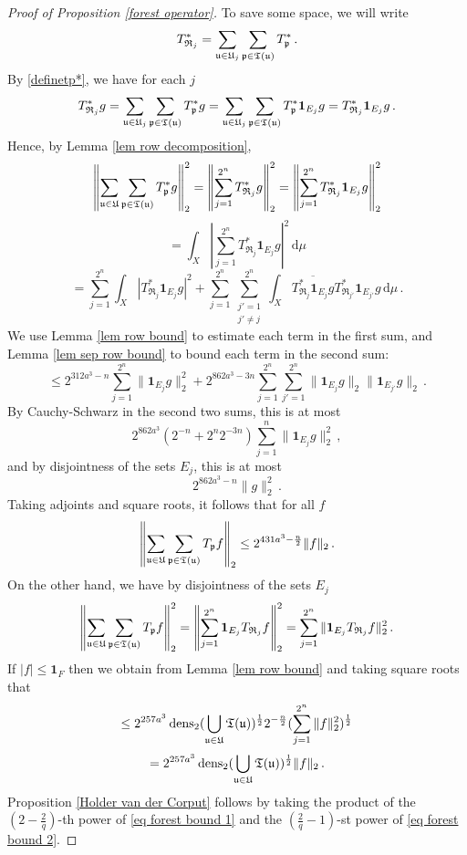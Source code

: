 {\begin{proof}[Proof of Proposition \ref{forest operator}]
    To save some space, we will write
    $$
        T_{\mathfrak{R}_j}^* = \sum_{\mathfrak u \in \mathfrak U_j} \sum_{\mathfrak p \in \mathfrak T(\mathfrak u)} T_{\mathfrak p}^*\,.
    $$
    By \eqref{definetp*}, we have for each $j$
    $$
        T_{\mathfrak{R}_j}^*g = \sum_{\mathfrak u \in \mathfrak U_j} \sum_{\mathfrak p \in \mathfrak T(\mathfrak u)} T_{\mathfrak p}^* g = \sum_{\mathfrak u \in \mathfrak U_j} \sum_{\mathfrak p \in \mathfrak T(\mathfrak u)} T_{\mathfrak p}^* \mathbf{1}_{E_j} g = T_{\mathfrak{R}_j}^* \mathbf{1}_{E_j} g\,.
    $$
    Hence, by Lemma \ref{lem row decomposition},
    $$
        \left\|\sum_{\mathfrak u \in \mathfrak U} \sum_{\mathfrak p \in \mathfrak T(\mathfrak u)} T^*_{\mathfrak p} g\right\|_2^2 = \left\|\sum_{j = 1}^{2^n} T^*_{\mathfrak{R}_{j}} g\right\|_2^2  =  \left\|\sum_{j=1}^{2^n} T^*_{\mathfrak{R}_{j}} \mathbf{1}_{E_j} g\right\|_2^2
    $$
    $$
        = \int_X \left|\sum_{j=1}^{2^n} T^*_{\mathfrak{R}_{j}} \mathbf{1}_{E_j} g\right|^2 \, \mathrm{d}\mu
    $$
    $$
        = \sum_{j=1}^{2^n} \int_X |T_{\mathfrak{R}_j}^* \mathbf{1}_{E_j} g|^2 + \sum_{j =1}^{2^n} \sum_{\substack{j' = 1\\j' \ne j}}^{2^n} \int_X \overline{ T_{\mathfrak{R}_j}^* \mathbf{1}_{E_j} g} T_{\mathfrak{R}_{j'}}^* \mathbf{1}_{E_{j'}} g \, \mathrm{d}\mu\,.
    $$
    We use Lemma \ref{lem row bound} to estimate each term in the first sum, and Lemma \ref{lem sep row bound} to bound each term in the second sum:
    $$
        \le 2^{312a^3-n} \sum_{j = 1}^{2^n} \|\mathbf{1}_{E_j} g\|_2^2 +  2^{862a^3-3 n}\sum_{j=1}^{2^n}\sum_{j' = 1}^{2^n} \|\mathbf{1}_{E_j} g\|_2 \|\mathbf{1}_{E_{j'}}g\|_2\,.
    $$
    By Cauchy-Schwarz in the second two sums, this is at most
    $$
        2^{862a^3} (2^{-n} + 2^{n}2^{-3 n}) \sum_{j = 1}^n \|\mathbf{1}_{E_j} g\|_2^2\,,
    $$
    and by disjointness of the sets $E_j$, this is at most
    $$
        2^{862a^3 - n} \|g\|_2^2\,.
    $$
    Taking adjoints and square roots, it follows that for all $f$
    \begin{equation}
        \label{eq forest bound 1}
        \left\|\sum_{\mathfrak u \in \mathfrak U} \sum_{\mathfrak p \in \mathfrak T(\mathfrak u)} T_{\mathfrak p} f\right\|_2 \le 2^{431a^3-\frac{n}{2}} \|f\|_2\,.
    \end{equation}
    On the other hand, we have by disjointness of the sets $E_j$
    $$
        \left\|\sum_{\mathfrak u \in \mathfrak U} \sum_{\mathfrak p \in \mathfrak T(\mathfrak u)} T_{\mathfrak p} f\right\|_2^2 =  \left\|\sum_{j=1}^{2^n} \mathbf{1}_{E_j} T_{\mathfrak{R}_{j}} f\right\|_2^2 = \sum_{j = 1}^{2^n} \|\mathbf{1}_{E_j} T_{\mathfrak{R}_{j}} f\|_2^2\,.
    $$
    If $|f| \le \mathbf{1}_F$ then we obtain from Lemma \ref{lem row bound} and taking square roots that
    $$
        \le 2^{257a^3} \operatorname{\operatorname{dens}}_2(\bigcup_{\mathfrak u\in \mathfrak U}\mathfrak T(\mathfrak u))^{\frac{1}{2}} 2^{-\frac{n}{2}} (\sum_{j = 1}^{2^n} \|f\|_2^2)^{\frac{1}{2}}
    $$
    \begin{equation}
        \label{eq forest bound 2}
        = 2^{257a^3} \operatorname{\operatorname{dens}}_2(\bigcup_{\mathfrak u\in \mathfrak U}\mathfrak T(\mathfrak u))^{\frac{1}{2}} \|f\|_2\,.
    \end{equation}
    Proposition \ref{Holder van der Corput} follows by taking the product of the $(2 - \frac{2}{q})$-th power of \eqref{eq forest bound 1} and the $(\frac{2}{q} - 1)$-st power of \eqref{eq forest bound 2}.
\end{proof}

}
